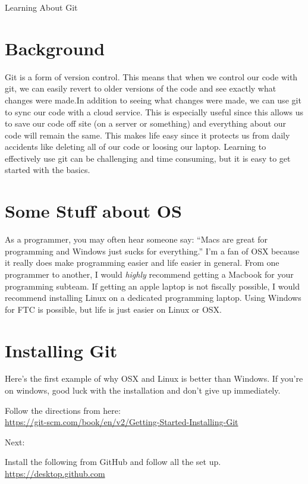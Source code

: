 \documentclass[11pt,fleqn]{article}
\theoremstyle{definition}
\begin{document}
\begin{center}
{\Huge
Learning About Git
}\\
\end{center}

\section{Background}
Git is a form of version control. This means that when we control our code with git, we can easily
revert to older versions of the code and see exactly what changes were made.In addition to seeing
what changes were made, we can use git to sync our code with a cloud service. This is especially
useful since this allows us to save our code off site (on a server or something) and everything
about our code will remain the same. This makes life easy since it protects us from daily accidents
like deleting all of our code or loosing our laptop. Learning to effectively use git can be
challenging and time consuming, but it is easy to get started with the basics. 

\section{Some Stuff about OS}
As a programmer, you may often hear someone say: ``Macs are great for programming and Windows just
sucks for everything.'' I'm a fan of OSX because it really does make programming easier and life
easier in general. From one programmer to another, I would \textit{highly} recommend getting a
Macbook for your programming subteam. If getting an apple laptop is not
fiscally possible, I would recommend installing Linux on a dedicated programming laptop. Using
Windows for FTC is possible, but life is just easier on Linux or OSX.  

\section{Installing Git}
Here's the first example of why OSX and Linux is better than Windows. If you're on windows, good
luck with the installation and don't give up immediately. 

Follow the directions from here: \\
\url{https://git-scm.com/book/en/v2/Getting-Started-Installing-Git}

Next:

Install the following from GitHub and follow all the set up.\\ 
\url{https://desktop.github.com}
\end{document}
